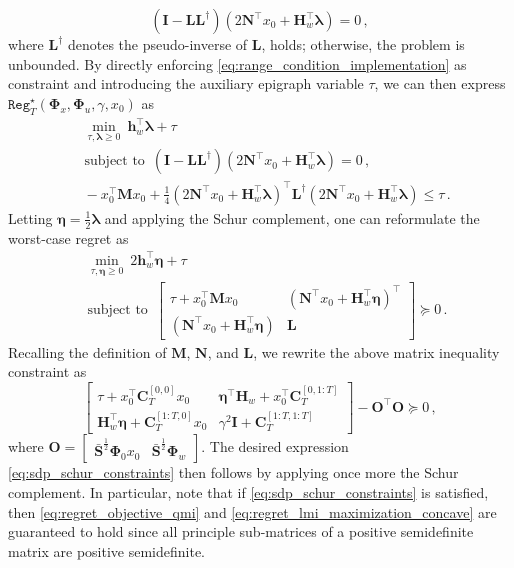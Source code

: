\documentclass[conference]{IEEEtran}
\DeclareMathOperator*{\st}{subject~to}
\begin{document}
    \begin{equation}
        \label{eq:range_condition_implementation}
        (\mathbf{I} - \mathbf{L} \mathbf{L}^\dagger) (2\mathbf{N}^\top x_0 + \mathbf{H}_w^\top \bm{\lambda}) = 0\,,
    \end{equation}
    where $\mathbf{L}^\dagger$ denotes the pseudo-inverse of $\mathbf{L}$, holds; otherwise, the problem is unbounded. By directly enforcing \eqref{eq:range_condition_implementation} as constraint and introducing the auxiliary epigraph variable $\tau$, we can then express $\mathtt{Reg}_T^\star(\bm{\Phi}_x, \bm{\Phi}_u, \gamma, x_0)$ as
    \begin{align*}
        &~\min_{\tau, \bm{\lambda} \geq 0} ~ \mathbf{h}_w^\top \bm{\lambda} + \tau\\
        &\st~ (\mathbf{I} - \mathbf{L} \mathbf{L}^\dagger) (2\mathbf{N}^\top x_0 + \mathbf{H}_w^\top \bm{\lambda}) = 0\,,\\
        & ~ -x_0^\top \mathbf{M} x_0 + \frac{1}{4}  (2\mathbf{N}^\top x_0 + \mathbf{H}_w^\top \bm{\lambda})^\top \mathbf{L}^\dagger (2\mathbf{N}^\top x_0 + \mathbf{H}_w^\top \bm{\lambda}) \leq \tau\,.
    \end{align*}
    Letting $\bm{\eta} = \frac{1}{2} \bm{\lambda}$ and applying the Schur complement, one can reformulate the worst-case regret as
    \begin{align*}
        &~\min_{\tau, \bm{\eta} \geq 0} ~ 2\mathbf{h}_w^\top \bm{\eta} + \tau\\
        &\st~ \begin{bmatrix}
            \tau + x_0^\top \mathbf{M} x_0 &  (\mathbf{N}^\top x_0 + \mathbf{H}_w^\top \bm{\eta})^\top\\
            (\mathbf{N}^\top x_0 + \mathbf{H}_w^\top \bm{\eta}) & \mathbf{L}
        \end{bmatrix} \succeq 0\,.
    \end{align*}
    Recalling the definition of $\mathbf{M}$, $\mathbf{N}$, and $\mathbf{L}$, we rewrite the above matrix inequality constraint as
    \begin{equation*}
        \begin{bmatrix}
            \tau + x_0^\top \mathbf{C}_T^{[0,0]} x_0 & \bm{\eta}^\top \mathbf{H}_w + x_0^\top \mathbf{C}_T^{[0, 1:T]} \\
            \mathbf{H}_w^\top \bm{\eta} + \mathbf{C}_T^{[1:T, 0]} x_0 & \gamma^2 \mathbf{I} + \mathbf{C}_T^{[1:T, 1:T]}
        \end{bmatrix}
        -
        \mathbf{O}^\top \mathbf{O}
        \succeq 0\,,
    \end{equation*}
    where $\mathbf{O} = \begin{bmatrix} \bar{\mathbf{S}}^\frac{1}{2} \bm{\Phi}_0 x_0 & \bar{\mathbf{S}}^\frac{1}{2} \bm{\Phi}_w \end{bmatrix}$. The desired expression \eqref{eq:sdp_schur_constraints} then follows by applying once more the Schur complement. In particular, note that if \eqref{eq:sdp_schur_constraints} is satisfied, then \eqref{eq:regret_objective_qmi} and \eqref{eq:regret_lmi_maximization_concave} are guaranteed to hold since all principle sub-matrices of a positive semidefinite matrix are positive semidefinite.
\end{document}
